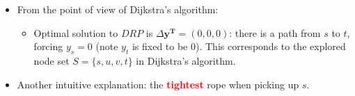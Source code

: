 \documentclass[mathserif]{beamer}
\begin{document}
{\begin{small}
\begin{itemize}
\begin{figure}
\end{figure}



\item From the point of view of Dijkstra's algorithm: 
\begin{itemize}
\item Optimal solution to $DRP$ is  $\Delta \mathbf{y^T} = (0, 0, 0)$: there is a path from $s$ to $t$,  forcing $y_{s} = 0$ (note $y_{t}$ is fixed to be $0$).  This corresponds to the explored node set $S = \{s, u, v, t\}$ in Dijkstra's algorithm. 
\end{itemize}
\item Another intuitive explanation: the \textcolor{red}{\bf tightest} rope when picking up $s$. 

\end{itemize}

\end{small}

}
\end{document}
